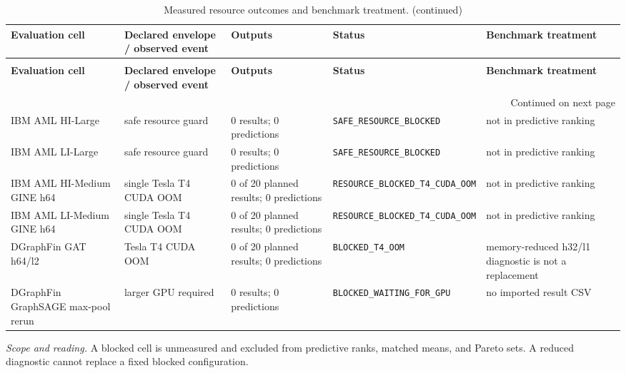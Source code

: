 \begingroup
\footnotesize
\setlength{\tabcolsep}{3pt}
\renewcommand{\arraystretch}{1.10}
\begin{longtable}{@{}p{} p{} p{} p{} p{}@{}}
\caption{Measured resource outcomes and benchmark treatment.}\label{tab:s-resource-cases}\\
\toprule
\textbf{Evaluation cell} & \textbf{Declared envelope / observed event} & \textbf{Outputs} & \textbf{Status} & \textbf{Benchmark treatment} \\
\midrule
\endfirsthead
\caption[]{Measured resource outcomes and benchmark treatment. (continued)}\\
\toprule
\textbf{Evaluation cell} & \textbf{Declared envelope / observed event} & \textbf{Outputs} & \textbf{Status} & \textbf{Benchmark treatment} \\
\midrule
\endhead
\midrule
\multicolumn{5}{r}{\footnotesize Continued on next page}\\
\endfoot
\bottomrule
\endlastfoot
IBM AML HI-Large & safe resource guard & 0 results; 0 predictions & \texttt{SAFE\_\allowbreak{}RESOURCE\_\allowbreak{}BLOCKED} & not in predictive ranking \\
IBM AML LI-Large & safe resource guard & 0 results; 0 predictions & \texttt{SAFE\_\allowbreak{}RESOURCE\_\allowbreak{}BLOCKED} & not in predictive ranking \\
IBM AML HI-Medium GINE h64 & single Tesla T4 CUDA OOM & 0 of 20 planned results; 0 predictions & \texttt{RESOURCE\_\allowbreak{}BLOCKED\_\allowbreak{}T4\_\allowbreak{}CUDA\_\allowbreak{}OOM} & not in predictive ranking \\
IBM AML LI-Medium GINE h64 & single Tesla T4 CUDA OOM & 0 of 20 planned results; 0 predictions & \texttt{RESOURCE\_\allowbreak{}BLOCKED\_\allowbreak{}T4\_\allowbreak{}CUDA\_\allowbreak{}OOM} & not in predictive ranking \\
DGraphFin GAT h64/l2 & Tesla T4 CUDA OOM & 0 of 20 planned results; 0 predictions & \texttt{BLOCKED\_\allowbreak{}T4\_\allowbreak{}OOM} & memory-reduced h32/l1 diagnostic is not a replacement \\
DGraphFin GraphSAGE max-pool rerun & larger GPU required & 0 results; 0 predictions & \texttt{BLOCKED\_\allowbreak{}WAITING\_\allowbreak{}FOR\_\allowbreak{}GPU} & no imported result CSV \\
\end{longtable}
\noindent\footnotesize\emph{Scope and reading.} A blocked cell is unmeasured and excluded from predictive ranks, matched means, and Pareto sets. A reduced diagnostic cannot replace a fixed blocked configuration.\par
\endgroup
